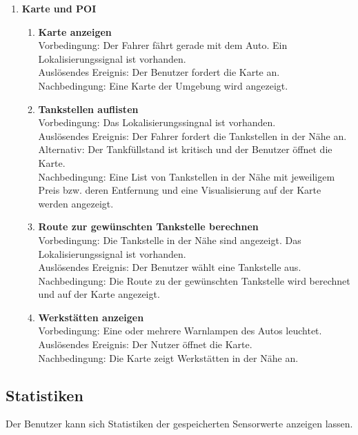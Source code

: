 \documentclass[pflichtenheft.tex]{subfiles}
\begin{document}
\begin{enumerate}
\begin{enumerate}
	\end{enumerate}
	
	\item{\textbf{Karte und POI}
	
	\begin{enumerate}
	
	\item{\textbf{Karte anzeigen}} \\Vorbedingung: Der Fahrer fährt gerade mit dem Auto. Ein Lokalisierungssignal ist vorhanden. \\ Auslösendes Ereignis: Der Benutzer fordert die Karte an. \\Nachbedingung: Eine Karte der Umgebung wird angezeigt.
  
  	\item {\textbf{Tankstellen auflisten}} \\ Vorbedingung: Das Lokalisierungssingnal ist vorhanden. \\ Auslösendes Ereignis: Der Fahrer fordert die Tankstellen in der Nähe an. Alternativ: Der Tankfüllstand ist kritisch und der Benutzer öffnet die Karte.\\ Nachbedingung: Eine List von Tankstellen in der Nähe mit jeweiligem Preis bzw. deren Entfernung und eine Visualisierung auf der Karte werden angezeigt.
  	
  	\item {\textbf{Route zur gewünschten Tankstelle berechnen}} \\Vorbedingung: Die Tankstelle in der Nähe sind angezeigt. Das
  Lokalisierungssignal ist vorhanden. \\ Auslösendes Ereignis: Der Benutzer wählt eine Tankstelle aus. \\Nachbedingung: Die Route zu der gewünschten Tankstelle wird berechnet und auf der Karte angezeigt.
  
	\item{\textbf{Werkstätten anzeigen}} \\ Vorbedingung: Eine oder mehrere Warnlampen des Autos leuchtet. \\ Auslösendes Ereignis: Der Nutzer öffnet die Karte. \\ Nachbedingung: Die Karte zeigt Werkstätten in der Nähe an.

	\end{enumerate}
}
\end{enumerate}



\subsection{\mkfa Statistiken} Der Benutzer kann sich Statistiken der gespeicherten Sensorwerte anzeigen lassen.
\end{document}
